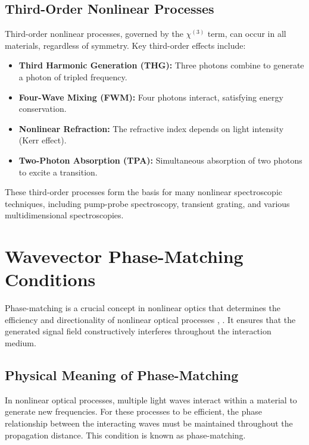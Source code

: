 \subsection{Third-Order Nonlinear Processes}
\label{subsec:third_order}

\noindent Third-order nonlinear processes, governed by the $\chi^{(3)}$ term, can occur in all materials, regardless of symmetry. Key third-order effects include:

\begin{itemize}
	\item \textbf{Third Harmonic Generation (THG):} Three photons combine to generate a photon of tripled frequency.
	\item \textbf{Four-Wave Mixing (FWM):} Four photons interact, satisfying energy conservation.
	\item \textbf{Nonlinear Refraction:} The refractive index depends on light intensity (Kerr effect).
	\item \textbf{Two-Photon Absorption (TPA):} Simultaneous absorption of two photons to excite a transition.
\end{itemize}

\noindent These third-order processes form the basis for many nonlinear spectroscopic techniques, including pump-probe spectroscopy, transient grating, and various multidimensional spectroscopies.


\section{Wavevector Phase-Matching Conditions}
\label{sec:phase_matching}

\noindent Phase-matching is a crucial concept in nonlinear optics that determines the efficiency and directionality of nonlinear optical processes \cite{boyd2008contents},  . It ensures that the generated signal field constructively interferes throughout the interaction medium.

\subsection{Physical Meaning of Phase-Matching}
\label{subsec:phase_matching_meaning}

\noindent In nonlinear optical processes, multiple light waves interact within a material to generate new frequencies. For these processes to be efficient, the phase relationship between the interacting waves must be maintained throughout the propagation distance. This condition is known as phase-matching.

